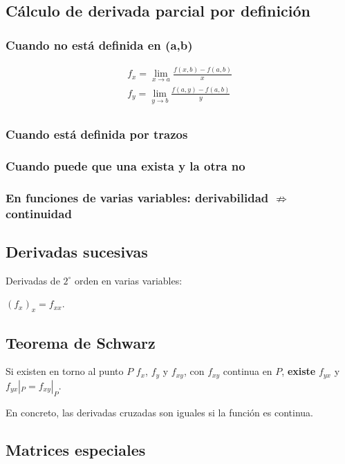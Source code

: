 \subsection{Cálculo de derivada parcial por definición}

\subsubsection{Cuando no está definida en (a,b)}

\begin{align*}
    f_x = \lim_{x \to a}\frac{f(x,b) - f(a,b)}{x} \\
    f_y = \lim_{y \to b}\frac{f(a,y) - f(a,b)}{y} \\
\end{align*}

\subsubsection{Cuando está definida por trazos}

\subsubsection{Cuando puede que una exista y la otra no}

\subsubsection{En funciones de varias variables: derivabilidad \(\nRightarrow\) continuidad}

\subsection{Derivadas sucesivas}

Derivadas de \(2^{\circ}\) orden en varias variables:

\((f_x)_x = f_{xx}\).

\subsection{Teorema de Schwarz}

Si existen en torno al punto \(P\) \(f_x\),
\(f_y\) 
y \(f_{xy}\),
con \(f_{xy}\) continua en \(P\),
\textbf{existe} \(f_{yx}\) y \(f_{yx}|_P = f_{xy}|_P\).

En concreto,
las derivadas cruzadas son iguales si la función es continua.

\subsection{Matrices especiales}

